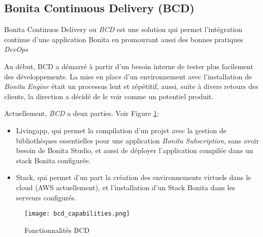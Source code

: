 \subsection{Bonita Continuous Delivery (BCD)} \label{bcd}
Bonita Continuos Delivery ou \textit{BCD} est une solution qui permet l'intégration continue d'une application Bonita en promouvant aussi des bonnes pratiques \emph{DevOps}

Au début, BCD a démarré à partir d'un besoin interne de tester plus facilement des développements. La mise en place d'un environnement avec l'installation de \textit{Bonita Engine} était un processus lent et répétitif, aussi, suite à divers retours des clients, la direction a décidé de le voir comme un potentiel produit.

Actuellement, \textit{BCD} a deux parties. Voir Figure \ref{fig:bcd_cap}:
\begin{itemize}
  \item Livingapp, qui permet la compilation d'un projet avec la gestion de bibliothèques essentielles pour une application \textit{Bonita Subscription}, sans avoir besoin de Bonita Studio, et aussi de déployer l'application compilée dans un stack Bonita configurée.
  \item Stack, qui permet d'un part la création des environnements virtuels dans le cloud (AWS actuellement), et l’installation d'un Stack Bonita dans les serveurs configurés.
\end{itemize}

\begin{figure}[!ht]
\centering
\texttt{[image: bcd\_capabilities.png]}
\caption{Fonctionnalités BCD}
\label{fig:bcd_cap}
\end{figure}
